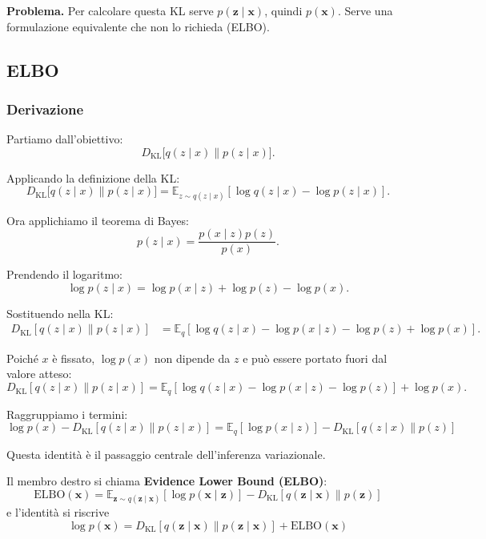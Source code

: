 \documentclass[11pt,a4paper]{article}
\providecommand{\E}{\mathbb{E}}
\providecommand{\DKL}{D_{\mathrm{KL}}}
\begin{document}
\textbf{Problema.} Per calcolare questa KL serve $p(\mathbf{z}\mid\mathbf{x})$,
quindi $p(\mathbf{x})$. Serve una formulazione equivalente che non lo richieda (ELBO).

\subsection{ELBO}

\subsubsection{Derivazione}
Partiamo dall'obiettivo:
\[
\DKL\big[q(z\mid x)\|p(z\mid x)\big].
\]

Applicando la definizione della KL:
\[
\DKL\big[q(z\mid x)\|p(z\mid x)\big]
=
\E_{z\sim q(z\mid x)}
\left[
\log q(z\mid x)-\log p(z\mid x)
\right].
\]

Ora applichiamo il teorema di Bayes:
\[
p(z\mid x)=\frac{p(x\mid z)p(z)}{p(x)}.
\]

Prendendo il logaritmo:
\[
\log p(z\mid x)
=
\log p(x\mid z)+\log p(z)-\log p(x).
\]

Sostituendo nella KL:
\begin{align*}
\DKL[q(z\mid x)\|p(z\mid x)]
&=
\E_{q}
\left[
\log q(z\mid x)
-\log p(x\mid z)
-\log p(z)
+\log p(x)
\right].
\end{align*}

Poiché $x$ è fissato, $\log p(x)$ non dipende da $z$ e può essere portato fuori dal valore atteso:
\[
\DKL[q(z\mid x)\|p(z\mid x)]
=
\E_q[\log q(z\mid x)-\log p(x\mid z)-\log p(z)]
+\log p(x).
\]

Raggruppiamo i termini:
\[
\boxed{
\log p(x)-\DKL[q(z\mid x)\|p(z\mid x)]
=
\E_q[\log p(x\mid z)]
-\DKL[q(z\mid x)\|p(z)]
}
\]

Questa identità è il passaggio centrale dell'inferenza variazionale.

Il membro destro si chiama \textbf{Evidence Lower Bound (ELBO)}:
\[
\boxed{
\mathrm{ELBO}(\mathbf{x})
=\E_{\mathbf{z}\sim q(\mathbf{z}\mid\mathbf{x})}[\log p(\mathbf{x}\mid\mathbf{z})]
-\DKL[q(\mathbf{z}\mid\mathbf{x})\|p(\mathbf{z})]
}
\]
e l'identità si riscrive
\[
\boxed{\log p(\mathbf{x})=\DKL[q(\mathbf{z}\mid\mathbf{x})\|p(\mathbf{z}\mid\mathbf{x})]+\mathrm{ELBO}(\mathbf{x})}
\]
\end{document}

